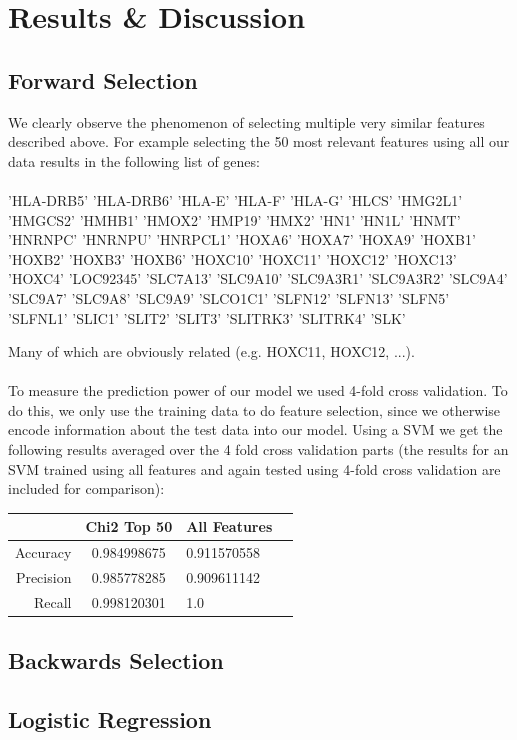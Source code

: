 \documentclass[11pt]{article}
\begin{document}
\section{Results \& Discussion}

\subsection{Forward Selection}
We clearly observe the phenomenon of selecting multiple very similar features described above. For example selecting the 50 most relevant features using all our data results in the following list of genes:\\\\
'HLA-DRB5' 'HLA-DRB6' 'HLA-E' 'HLA-F' 'HLA-G' 'HLCS' 'HMG2L1' 'HMGCS2'
 'HMHB1' 'HMOX2' 'HMP19' 'HMX2' 'HN1' 'HN1L' 'HNMT' 'HNRNPC' 'HNRNPU'
 'HNRPCL1' 'HOXA6' 'HOXA7' 'HOXA9' 'HOXB1' 'HOXB2' 'HOXB3' 'HOXB6' 'HOXC10'
 'HOXC11' 'HOXC12' 'HOXC13' 'HOXC4' 'LOC92345' 'SLC7A13' 'SLC9A10'
 'SLC9A3R1' 'SLC9A3R2' 'SLC9A4' 'SLC9A7' 'SLC9A8' 'SLC9A9' 'SLCO1C1'
 'SLFN12' 'SLFN13' 'SLFN5' 'SLFNL1' 'SLIC1' 'SLIT2' 'SLIT3' 'SLITRK3'
 'SLITRK4' 'SLK'
 
Many of which are obviously related (e.g. HOXC11, HOXC12, ...).\\\\
To measure the prediction power of our model we used 4-fold cross validation. To do this, we only use the training data to do feature selection, since we otherwise encode information about the test data into our model. Using a SVM we get the following results averaged over the 4 fold cross validation parts (the results for an SVM trained using all features and again tested using 4-fold cross validation are included for comparison):\\

\begin{tabular}{r | c l c }
    & Chi2 Top 50 & All Features\\
  \hline 
    Accuracy & 0.984998675 & 0.911570558 \\
    Precision & 0.985778285 & 0.909611142 \\
    Recall & 0.998120301 & 1.0 \\
  
\end{tabular}
\subsection{Backwards Selection}
\subsection{Logistic Regression}
\end{document}
